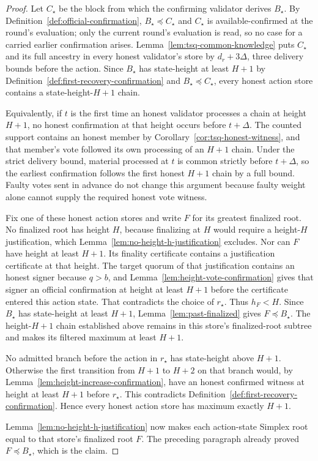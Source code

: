 \begin{proof}
Let \(C_\star\) be the block from which the confirming validator derives
\(B_\star\).  By Definition~\ref{def:official-confirmation},
\(B_\star\preceq C_\star\) and \(C_\star\) is available-confirmed at the
round's evaluation; only the current round's evaluation is read, so no
case for a carried earlier confirmation arises.
Lemma~\ref{lem:tsq-common-knowledge} puts \(C_\star\) and its full
ancestry in every honest validator's store by \(d_r+3\Delta\), three
delivery bounds before the action.  Since \(B_\star\) has state-height at
least \(H+1\) by Definition~\ref{def:first-recovery-confirmation} and
\(B_\star\preceq C_\star\), every honest action store contains a
state-height-\(H+1\) chain.

Equivalently, if \(t\) is the first time an honest validator processes a
chain at height \(H+1\), no honest confirmation at that height occurs before
\(t+\Delta\).  The counted support contains an honest member by
Corollary~\ref{cor:tsq-honest-witness}, and that member's vote followed
its own processing of an \(H+1\) chain.
Under the strict delivery bound, material processed at \(t\) is common
strictly before \(t+\Delta\), so the earliest confirmation follows the
first honest \(H+1\) chain by a full bound.  Faulty votes sent in
advance do not change this argument because faulty weight alone cannot
supply the required honest vote witness.

Fix one of these honest action stores and write \(F\) for its greatest
finalized root.
No finalized root has height \(H\), because finalizing at \(H\) would require
a height-\(H\) justification, which
Lemma~\ref{lem:no-height-h-justification} excludes.  Nor can \(F\) have height at
least \(H+1\).  Its finality certificate contains a justification certificate
at that height.  The target quorum of that justification contains an honest
signer because \(q>b\), and
Lemma~\ref{lem:height-vote-confirmation} gives that signer an official
confirmation at height at least \(H+1\) before the certificate entered this
action state.  That contradicts the choice of \(r_\star\).
Thus \(h_F<H\).  Since \(B_\star\) has state-height at least \(H+1\),
Lemma~\ref{lem:past-finalized} gives \(F\preceq B_\star\).  The
height-\(H+1\) chain established above remains in this store's
finalized-root subtree and makes its filtered maximum at least \(H+1\).

No admitted branch before the action in \(r_\star\) has state-height above
\(H+1\).
Otherwise the first transition from \(H+1\) to \(H+2\) on that branch would,
by Lemma~\ref{lem:height-increase-confirmation}, have an honest confirmed
witness at height at least \(H+1\) before \(r_\star\).  This contradicts
Definition~\ref{def:first-recovery-confirmation}.  Hence every honest action
store has maximum exactly \(H+1\).

Lemma~\ref{lem:no-height-h-justification} now makes each action-state Simplex root
equal to that store's finalized root \(F\).  The preceding paragraph already
proved \(F\preceq B_\star\), which is the claim.
\end{proof}

